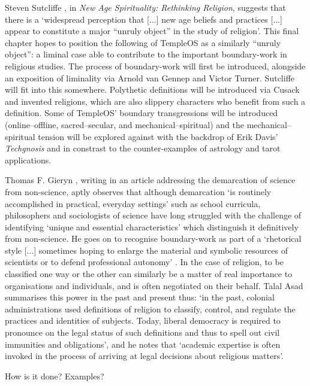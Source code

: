 \documentclass{article}
\begin{document}
Steven Sutcliffe \parencite*{Sutcliffe14},
in \textit{New Age Spirituality: Rethinking Religion},
suggests that there is a `widespread perception that [...]
new age beliefs and practices [...] appear to constitute
a major ``unruly object'' in the study of religion'.
This final chapter hopes to position the following of TempleOS as a
similarly ``unruly object'': a liminal case able to contribute to the
important boundary-work in religious studies.
The process of boundary-work will first be introduced,
alongside an exposition of liminality via Arnold van Gennep and Victor Turner.
Sutcliffe will fit into this somewhere.
Polythetic definitions will be introduced via Cusack and invented religions,
which are also slippery characters who benefit from such a definition.
Some of TempleOS' boundary transgressions will be introduced
(online--offline, sacred--secular, and mechanical--spiritual)
and the mechanical--spiritual tension will be explored
against with the backdrop of Erik Davis' \textit{Techgnosis}
and in constrast to the counter-examples of astrology and tarot applications.

Thomas F. Gieryn \parencite*[781]{Gieryn83}, writing in an article
addressing the demarcation of science from non-science, aptly observes
that although demarcation `is routinely accomplished in practical,
everyday settings' such as school curricula,
philosophers and sociologists of science have long struggled
with the challenge of identifying `unique and essential characteristics'
which distinguish it definitively from non-science.
He goes on to recognise boundary-work as part of a `rhetorical style [...]
sometimes hoping to enlarge the material and symbolic resources of scientists
or to defend professional autonomy' \parencite[782]{Gieryn83}.
In the case of religion, to be classified one way or the other can similarly
be a matter of real importance to organisations and individuals,
and is often negotiated on their behalf.
Talal Asad \parencite*[39]{Asad11} summarises this power
in the past and present thus:
`in the past, colonial  administrations  used definitions of religion
to classify, control, and regulate the practices and identities of subjects.
Today, liberal democracy  is required to pronounce on the legal status
of such definitions and thus to spell out civil immunities and obligations',
and he notes that `academic expertise is often invoked
in the process of arriving at legal decisions about religious matters'.

How is it done? Examples?
\end{document}
